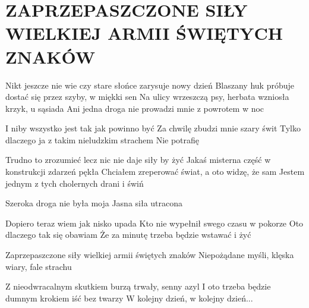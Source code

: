 \documentclass[../../../songbook.tex]{subfiles}
\begin{document}
\TabPositions{10cm} %
\section*{ZAPRZEPASZCZONE SIŁY WIELKIEJ \newline ARMII ŚWIĘTYCH ZNAKÓW}
{}
\vspace{1.5cm}
Nikt jeszcze nie wie czy stare słońce zarysuje nowy dzień		 \newline	 
Blaszany huk próbuje dostać się przez szyby, w miękki sen \newline	 
Na ulicy wrzeszczą psy, herbata wzniosła krzyk, u sąsiada    \newline	 
Ani jedna droga nie prowadzi mnie z powrotem w noc \newline	 

I niby wszystko jest tak jak powinno być \newline	 
Za chwilę zbudzi mnie szary świt \newline	 
Tylko dlaczego ja z takim nieludzkim strachem \newline	 
Nie potrafię \newline	 

Trudno to zrozumieć lecz nic nie daje siły by żyć \newline	 
Jakaś misterna część w konstrukcji zdarzeń pękła \newline	 
Chciałem zreperować świat, a oto widzę, że sam \newline	 
Jestem jednym z tych cholernych drani i świń \newline	 

Szeroka droga nie była moja	 \newline	 
Jasna siła utracona \newline	 

Dopiero teraz wiem jak nisko upada \newline	 
Kto nie wypełnił swego czasu w pokorze \newline	 
Oto dlaczego tak się obawiam \newline	 
Że za minutę trzeba będzie wstawać i żyć \newline	 

\-\hspace{1cm} Zaprzepaszczone siły wielkiej armii	świętych znaków		 \newline	 
\-\hspace{1cm} Niepożądane myśli, klęska wiary, fale strachu \newline	 

\-\hspace{1cm} Z nieodwracalnym skutkiem burzą trwały, senny azyl 	 \newline
\-\hspace{1cm} I oto trzeba będzie dumnym krokiem iść bez twarzy \newline	 
\-\hspace{1cm} W kolejny dzień, w kolejny dzień... \newline	 
\end{document}
